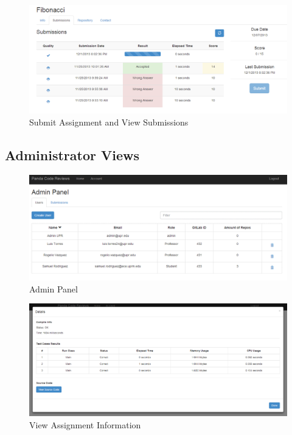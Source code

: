 \begin{figure}[H]
	\centering
	\includegraphics[width=\textwidth]{img/submission-screen}
	\caption{Submit Assignment and View Submissions}
\end{figure}

\subsection{Administrator Views}

\begin{figure}[H]
	\centering
	\includegraphics[width=\textwidth]{img/adminPanel-screen}
	\caption{Admin Panel}
\end{figure}

\begin{figure}[H]
	\centering
	\includegraphics[width=\textwidth]{img/assigninfo-screen}
	\caption{View Assignment Information}
\end{figure}

